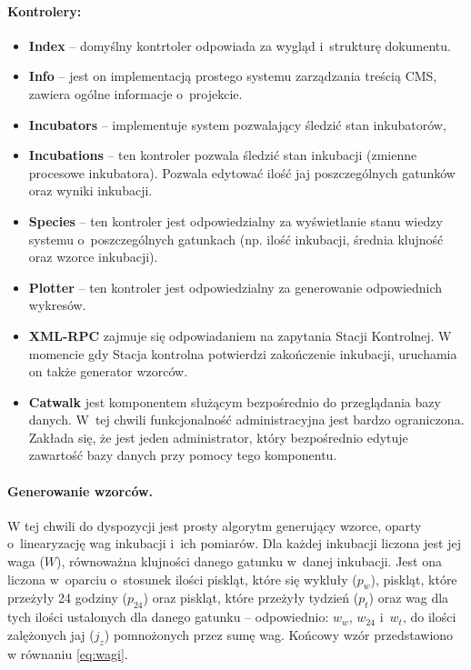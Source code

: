 \paragraph{Kontrolery:}
\begin{itemize}
\item \textbf{Index} -- domyślny kontrtoler odpowiada za wygląd i~strukturę
	dokumentu.
\item \textbf{Info} -- jest on implementacją prostego systemu zarządzania
	treścią CMS, zawiera ogólne informacje o~projekcie.
\item \textbf{Incubators} -- implementuje system pozwalający śledzić stan
	inkubatorów,
\item \textbf{Incubations} -- ten kontroler pozwala śledzić stan inkubacji
	(zmienne procesowe inkubatora). Pozwala edytować ilość jaj poszczególnych
	gatunków oraz wyniki inkubacji. 
\item \textbf{Species} -- ten kontroler jest odpowiedzialny za wyświetlanie
	stanu wiedzy systemu o~poszczególnych gatunkach (np. ilość inkubacji, średnia
	klujność oraz wzorce inkubacji).
\item \textbf{Plotter} -- ten kontroler jest odpowiedzialny za generowanie
	odpowiednich wykresów.
\item \textbf{XML-RPC} zajmuje się odpowiadaniem na zapytania Stacji Kontrolnej.
	W momencie gdy Stacja kontrolna potwierdzi zakończenie inkubacji, uruchamia on
	także generator wzorców.
\item \textbf{Catwalk} jest komponentem służącym bezpośrednio do przeglądania bazy danych. W~tej chwili funkcjonalność administracyjna jest bardzo ograniczona. Zakłada się, że jest jeden administrator, który bezpośrednio edytuje zawartość bazy danych przy pomocy tego komponentu.
\end{itemize}

\paragraph{Generowanie wzorców.}
W tej chwili do dyspozycji jest prosty algorytm generujący wzorce, oparty
o~linearyzację wag inkubacji i~ich pomiarów. Dla każdej inkubacji liczona jest
jej waga ($W$), równoważna klujności danego gatunku w~danej inkubacji. Jest ona
liczona w~oparciu o~stosunek ilości piskląt, które się wykluły ($p_w$), piskląt,
które przeżyły 24 godziny ($p_{24}$) oraz piskląt, które przeżyły tydzień
($p_t$) oraz wag dla tych ilości ustalonych dla danego gatunku -- odpowiednio:
$w_w$, $w_{24}$ i~$w_t$, do ilości zalężonych jaj ($j_z$) pomnożonych przez sumę
wag. Końcowy wzór przedstawiono w równaniu \ref{eq:wagi}.

